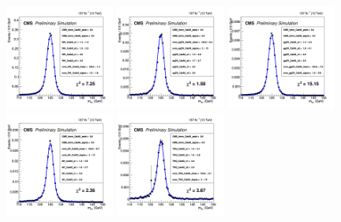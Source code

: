 \begin{figure}[!htb]
  \centering
  \captionsetup{justification=justified}
  \includegraphics[width=0.32\textwidth]{pics/VH_sec/WH_signal_models//WH_CatAll_fit_DSCB_1.png}
  \includegraphics[width=0.32\textwidth]{pics/VH_sec/WH_signal_models/qqZH_CatAll_fit_DSCB_1.png}
  \includegraphics[width=0.32\textwidth]{pics/VH_sec/WH_signal_models/ggZH_CatAll_fit_DSCB_1.png}
  \includegraphics[width=0.32\textwidth]{pics/VH_sec/WH_signal_models/ttH_CatAll_fit_DSCB_1.png}
  \includegraphics[width=0.32\textwidth]{pics/VH_sec/WH_signal_models/THQ_CatAll_fit_DSCB_1.png}

\end{figure}
